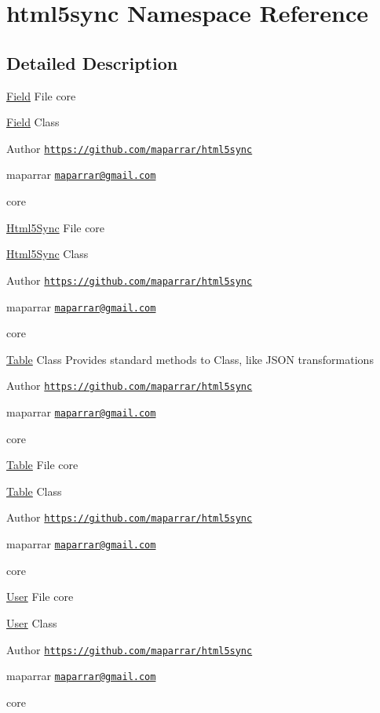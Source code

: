 \hypertarget{namespacehtml5sync}{\section{html5sync Namespace Reference}
\label{namespacehtml5sync}
}


\subsection{Detailed Description}
\hyperlink{classField}{Field} File  core

\hyperlink{classField}{Field} Class

\begin{DoxyAuthor}{Author}
\href{https://github.com/maparrar/html5sync}{\tt https\-://github.\-com/maparrar/html5sync} 

maparrar \href{mailto:maparrar@gmail.com}{\tt maparrar@gmail.\-com}
\end{DoxyAuthor}
core

\hyperlink{classHtml5Sync}{Html5\-Sync} File  core

\hyperlink{classHtml5Sync}{Html5\-Sync} Class

\begin{DoxyAuthor}{Author}
\href{https://github.com/maparrar/html5sync}{\tt https\-://github.\-com/maparrar/html5sync} 

maparrar \href{mailto:maparrar@gmail.com}{\tt maparrar@gmail.\-com}
\end{DoxyAuthor}
core

\hyperlink{classTable}{Table} Class Provides standard methods to Class, like J\-S\-O\-N transformations

\begin{DoxyAuthor}{Author}
\href{https://github.com/maparrar/html5sync}{\tt https\-://github.\-com/maparrar/html5sync} 

maparrar \href{mailto:maparrar@gmail.com}{\tt maparrar@gmail.\-com}
\end{DoxyAuthor}
core

\hyperlink{classTable}{Table} File  core

\hyperlink{classTable}{Table} Class

\begin{DoxyAuthor}{Author}
\href{https://github.com/maparrar/html5sync}{\tt https\-://github.\-com/maparrar/html5sync} 

maparrar \href{mailto:maparrar@gmail.com}{\tt maparrar@gmail.\-com}
\end{DoxyAuthor}
core

\hyperlink{classUser}{User} File  core

\hyperlink{classUser}{User} Class

\begin{DoxyAuthor}{Author}
\href{https://github.com/maparrar/html5sync}{\tt https\-://github.\-com/maparrar/html5sync} 

maparrar \href{mailto:maparrar@gmail.com}{\tt maparrar@gmail.\-com}
\end{DoxyAuthor}
core 